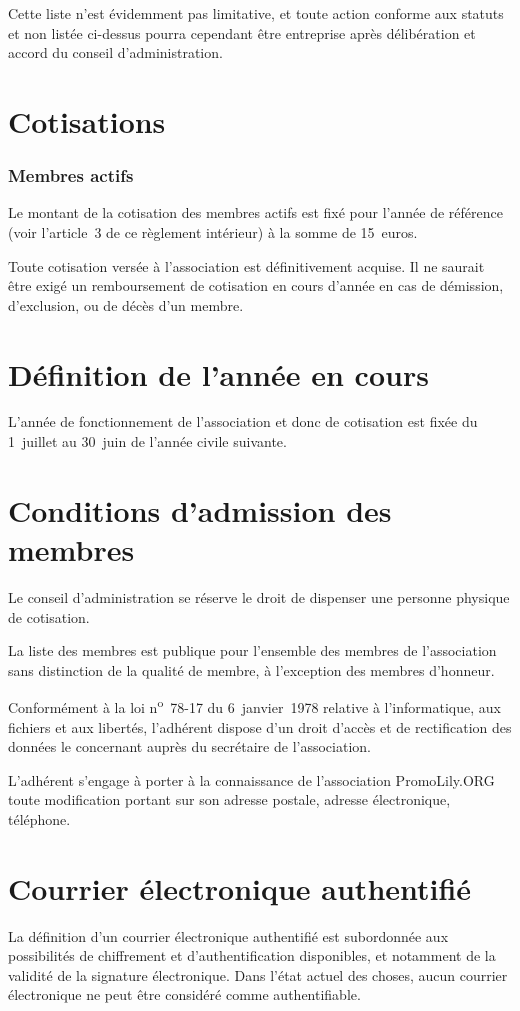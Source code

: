 \documentclass[a4wide,12pt]{scrartcl}
\newcommand{\qui}{PromoLily.ORG\xspace}
\begin{document}
Cette liste n'est évidemment pas limitative, et toute action conforme
aux statuts et non listée ci-dessus pourra cependant être entreprise
après délibération et accord du conseil d'administration. 


\section{Cotisations}
\subsubsection{Membres actifs}
Le montant de la cotisation des membres actifs est fixé pour l'année
de référence (voir l'article~3 de ce règlement intérieur) à la somme
de 15~euros.

Toute cotisation versée à l'association est définitivement acquise. Il
ne saurait être exigé un remboursement de cotisation en cours d'année
en cas de démission, d'exclusion, ou de décès d'un membre.

\section{Définition de l'année en cours}
L'année de fonctionnement de l'association et donc de cotisation est
fixée du 1\ier{}~juillet au 30~juin de l'année civile suivante. 


\section{Conditions d'admission des membres}
Le conseil d'administration se réserve le droit de dispenser une
personne physique de cotisation. 

La liste des membres est publique pour l'ensemble des membres de
l'association sans distinction de la qualité de membre, à l'exception
des membres d'honneur.

Conformément à la loi n\textsuperscript{o}~78-17 du 6~janvier~1978
relative à l'informatique, aux fichiers et aux libertés, l'adhérent
dispose d'un droit d'accès et de rectification des données le
concernant auprès du secrétaire de l'association.

L'adhérent s'engage à porter à la connaissance de l'association
\qui toute modification portant sur son adresse postale, adresse
électronique, téléphone.


\section{Courrier électronique authentifié}
La définition d'un courrier électronique authentifié est subordonnée
aux possibilités de chiffrement et d'authentification disponibles, et
notamment de la validité de la signature électronique. Dans l'état
actuel des choses, aucun courrier électronique ne peut être considéré
comme authentifiable.
\end{document}
